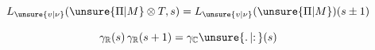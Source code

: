 \[
L_{\unsure{v|\nu}}(\unsure{\Pi|M}\otimes T,s)=L_{\unsure{v|\nu}}(\unsure{\Pi|M})(s\pm1)
\]

\[
\gamma_{\mathbb{R}}(s)\,\gamma_{\mathbb{R}}(s+1)
=\gamma_{\mathbb{C}}\unsure{\mathpunct{.}|\mathpunct{:}}(s)
\]
\clearpage
